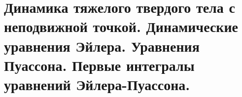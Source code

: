 \section{Динамика тяжелого твердого тела с неподвижной точкой. Динамические уравнения Эйлера. Уравнения Пуассона. Первые интегралы уравнений Эйлера-Пуассона.}\label{chasec13}



\newpage